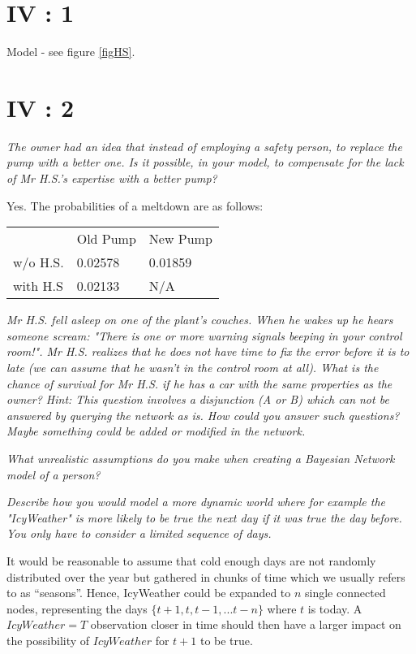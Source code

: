 \section{IV : 1}
Model - see figure \ref{figHS}.


\section{IV : 2}
\begin{framed}\em The owner had an idea that instead of employing a safety person, to replace the pump with a better one. Is it possible, in your model, to compensate for the lack of Mr H.S.'s expertise with a better pump?\em \end{framed}

Yes. The probabilities of a meltdown are as follows:

\begin{tabular}{l|l|l}
  & Old Pump & New Pump\\
  w/o H.S. & 0.02578 & 0.01859\\
  with H.S & 0.02133 & N/A
\end{tabular}


\begin{framed}\em Mr H.S. fell asleep on one of the plant's couches. When he wakes up he hears someone scream: "There is one or more warning signals beeping in your control room!". Mr H.S. realizes that he does not have time to fix the error before it is to late (we can assume that he wasn't in the control room at all). What is the chance of survival for Mr H.S. if he has a car with the same properties as the owner? Hint: This question involves a disjunction (A or B) which can not be answered by querying the network as is. How could you answer such questions? Maybe something could be added or modified in the network.\em\end{framed}


\begin{framed}\em What unrealistic assumptions do you make when creating a Bayesian Network model of a person?\em\end{framed}



\begin{framed}\em Describe how you would model a more dynamic world where for example the "IcyWeather" is more likely to be true the next day if it was true the day before. You only have to consider a limited sequence of days.\em\label{42}\end{framed}

It would be reasonable to assume that cold enough days are not randomly distributed over the year but gathered in chunks of time which we usually refers to as ``seasons''. Hence, IcyWeather could be expanded to $n$ single connected nodes, representing the days $\{t+1, t, t-1, ... t-n\}$ where $t$ is today. A $IcyWeather=T$ observation closer in time should then have a larger impact on the possibility of $IcyWeather$ for $t+1$ to be true.
